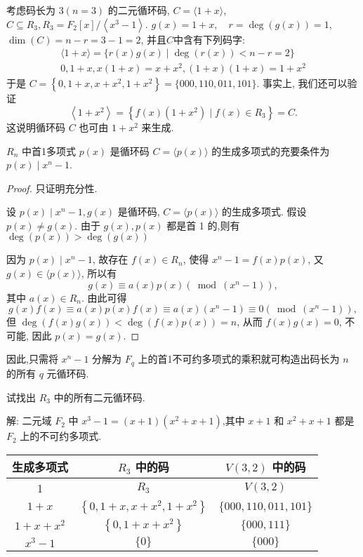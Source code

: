 \begin{example}
 考虑码长为 $ 3(n=3) $ 的二元循环码, $ C=\langle 1+x\rangle $,$C \subseteq R_{3}, R_{3}=F_{2}[x] /\left\langle x^{3}-1\right\rangle$.
 $g(x)=1+x, \quad r=\operatorname{deg}(g(x))=1$,$\operatorname{dim}(C)=n-r=3-1=2$, 并且$C$中含有下列码字:
$$
\begin{array}{l}
\langle 1+x\rangle=\{r(x) g(x) \mid \operatorname{deg}(r(x))<n-r=2\} \\
0,1+x, x(1+x)=x+x^{2},(1+x)(1+x)=1+x^{2} 
\end{array}
$$
 于是 $ C=\left\{0,1+x, x+x^{2}, 1+x^{2}\right\}=\{000,110,011,101\}$.
事实上, 我们还可以验证
$$
\left\langle 1+x^{2}\right\rangle=\left\{f(x)\left(1+x^{2}\right) \mid f(x) \in R_{3}\right\}=C .
$$
这说明循环码 $ C $ 也可由 $ 1+x^{2} $ 来生成.
\end{example}


\begin{theorem}
$ R_{n} $ 中首1多项式 $ p(x) $ 是循环码 $ C=\langle p(x)\rangle $ 的生成多项式的充要条件为 $ p(x) \mid x^{n}-1 $.
\end{theorem}
\begin{proof}
 只证明充分性.
 
设 $ p(x) \mid x^{n}-1, g(x) $ 是循环码, $ C=\langle p(x)\rangle $ 的生成多项式. 假设 $ p(x) \neq g(x) $. 由于 $ g(x), p(x) $ 都是首 1 的,则有 $ \operatorname{deg}(p(x))>\operatorname{deg}(g(x)) $

因为 $ p(x) \mid x^{n}-1 $, 故存在 $ f(x) \in R_{n} $, 使得 $ x^{n}-1=f(x) p(x) $, 又 $ g(x) \in\langle p(x)\rangle $, 所以有
$$
g(x) \equiv a(x) p(x)\left(\bmod \left(x^{n}-1\right)\right),
$$
其中 $ a(x) \in R_{n} $. 由此可得
$$
g(x) f(x) \equiv a(x) p(x) f(x) \equiv a(x)\left(x^{n}-1\right) \equiv 0\left(\bmod \left(x^{n}-1\right)\right),
$$
但 $ \operatorname{deg}(f(x) g(x))<\operatorname{deg}(f(x) p(x))=n $, 从而 $ f(x) g(x)=0 $, 不可能, 因此 $ p(x)=g(x) $.
\end{proof}

因此,只需将 $ x^{n}-1 $ 分解为 $ F_{q} $ 上的首1不可约多项式的乘积就可构造出码长为 $ n $ 的所有 $ q $ 元循环码.
 
\begin{example}
    试找出 $ R_{3} $ 中的所有二元循环码.

    解: 二元域 $ F_{2} $ 中 $ x^{3}-1=(x+1)\left(x^{2}+x+1\right) $,其中 $ x+1 $ 和 $ x^{2}+x+1 $ 都是 $ F_{2} $ 上的不可约多项式.
    \begin{center}
\begin{tabular}{|c|c|c|}
\hline 生成多项式 & $ R_{3} $ 中的码 & $ V(3,2) $ 中的码 \\
\hline 1 & $ R_{3} $ & $ V(3,2) $ \\
\hline $ 1+x $ & $ \left\{0,1+x, x+x^{2}, 1+x^{2}\right\} $ & $ \{000,110,011,101\} $ \\
\hline $ 1+x+x^{2} $ & $ \left\{0,1+x+x^{2}\right\} $ & $ \{000,111\} $ \\
\hline$ x^{3}-1 $ & $ \{0\} $ & $ \{000\} $ \\
\hline
\end{tabular}
 \end{center}
\end{example}

